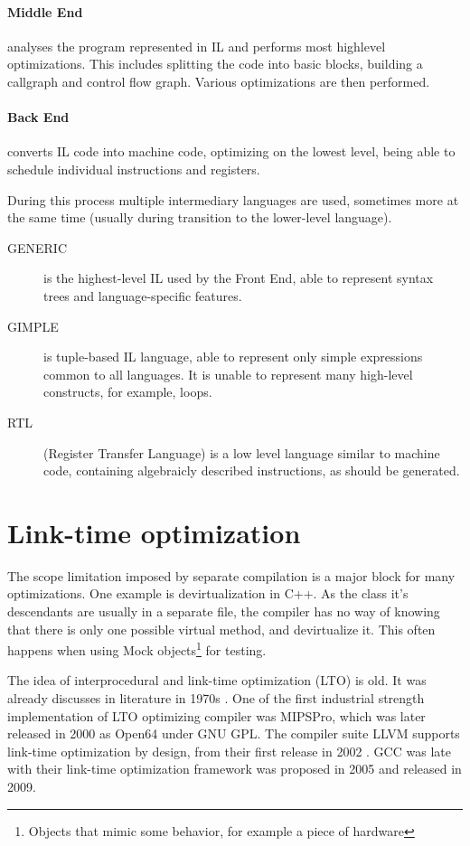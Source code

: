 \paragraph{Middle End} analyses the program represented in IL and performs most
highlevel optimizations. This includes splitting the code into basic blocks,
building a callgraph and control flow graph. Various optimizations are then
performed.

\paragraph{Back End} converts IL code into machine code, optimizing on the
lowest level, being able to schedule individual instructions and registers.

During this process multiple intermediary languages are used, sometimes more at
the same time (usually during transition to the lower-level language).

\begin{description}
	\item[GENERIC] is the highest-level IL used by the Front End, able to
		represent syntax trees and language-specific features.
	\item[GIMPLE] is tuple-based IL language, able to represent only simple
		expressions common to all languages. It is unable to represent many
		high-level constructs, for example, loops.
	\item[RTL] (Register Transfer Language) is a low level language similar to
		machine code, containing algebraicly described instructions, as should
		be generated.
\end{description}


\section{Link-time optimization}

The scope limitation imposed by separate compilation is a major block for many
optimizations. One example is devirtualization in C++. As the class it's
descendants are usually in a separate file, the compiler has no way of knowing
that there is only one possible virtual method, and devirtualize it.  This often
happens when using Mock objects\footnote{Objects that mimic some behavior, for
example a piece of hardware} for testing.

The idea of interprocedural and link-time optimization (LTO) is old. 
It was already discusses in literature in 1970s \cite{Allen:1974,Allen:1976}.
One of the first industrial strength implementation of LTO optimizing compiler
was MIPSPro, which was later released in 2000 as Open64 under GNU GPL. The
compiler suite LLVM supports link-time optimization by design, from their first
release in 2002 \cite{lattner2002llvm}.  GCC was late with their link-time
optimization framework was proposed in 2005 \cite{gcclto,briggs2007whopr} and
released in 2009.

